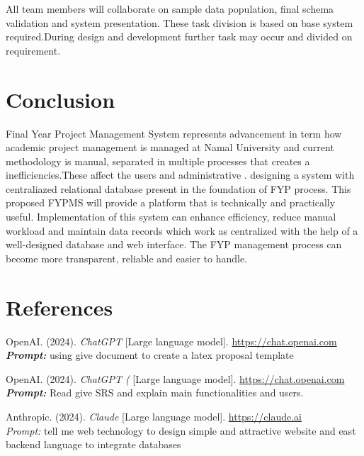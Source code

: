 \documentclass[12pt,a4paper]{report}
\begin{document}
\normalsize
\vspace{4pt}

All team members will collaborate on sample data population, final schema validation and system presentation. These task division is based on base system required.During design and development further task may occur and divided on requirement.

\section{Conclusion}

Final Year Project Management System represents advancement in term how academic project management is managed at Namal University and 
current methodology is manual, separated in multiple processes that creates a inefficiencies.These
affect the users and administrative . designing a system with centraliazed
relational database present in the foundation of FYP process. This proposed FYPMS will provide
a platform that is  technically and practically useful. Implementation of this system can enhance efficiency, reduce manual workload and maintain data records which work as centralized with the help of a well-designed database and web interface. The FYP management process can become more transparent, reliable and easier to handle.

\section{References}

OpenAI. (2024). \textit{ChatGPT } [Large language model]. 
\url{https://chat.openai.com} \\
\textit \textbf{Prompt: } using give document to create a latex proposal template


OpenAI. (2024). \textit{ChatGPT (} [Large language model]. 
\url{https://chat.openai.com} \\
\textit \textbf{Prompt: } Read give SRS and explain main functionalities and users.

Anthropic. (2024). \textit{Claude } [Large language model]. 
\url{https://claude.ai} \\
\textit{Prompt: } tell me web technology to design simple and attractive website and east backend language to integrate databases
\end{document}

